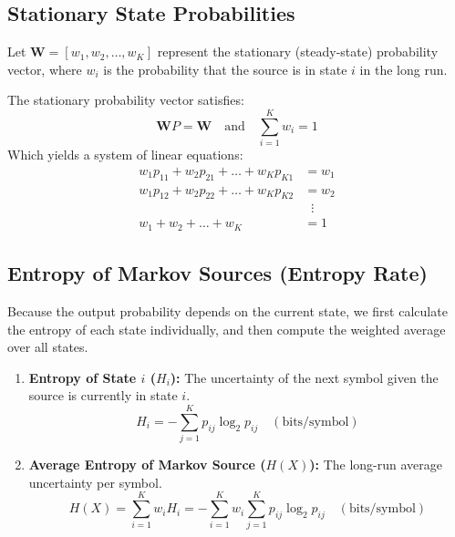 \documentclass[12pt,a4paper]{article}
\begin{document}
\subsection{Stationary State Probabilities}
Let $\mathbf{W} = [w_1, w_2, \dots, w_K]$ represent the stationary (steady-state) probability vector, where $w_i$ is the probability that the source is in state $i$ in the long run.
\begin{tcolorbox}[formulabox, title={\textbf{Stationary State Probability Equations}}]
The stationary probability vector satisfies:
\begin{equation}
  \mathbf{W} P = \mathbf{W} \quad \text{and} \quad \sum_{i=1}^K w_i = 1
\end{equation}
Which yields a system of linear equations:
\begin{align}
  w_1 p_{11} + w_2 p_{21} + \dots + w_K p_{K1} &= w_1 \\
  w_1 p_{12} + w_2 p_{22} + \dots + w_K p_{K2} &= w_2 \\
  &\;\; \vdots \\
  w_1 + w_2 + \dots + w_K &= 1
\end{align}
\end{tcolorbox}

\subsection{Entropy of Markov Sources (Entropy Rate)}
Because the output probability depends on the current state, we first calculate the entropy of each state individually, and then compute the weighted average over all states.
\begin{tcolorbox}[formulabox, title={\textbf{Markov Source Entropy Rate Formulas}}]
\begin{enumerate}[label=\textbf{\arabic*.}, leftmargin=1.5em, itemsep=4pt, topsep=2pt]
  \item \textbf{Entropy of State $i$ ($H_i$):} The uncertainty of the next symbol given the source is currently in state $i$.
    \begin{equation}
      H_i = -\sum_{j=1}^K p_{ij} \log_2 p_{ij} \quad (\text{bits/symbol})
    \end{equation}
  \item \textbf{Average Entropy of Markov Source ($H(X)$):} The long-run average uncertainty per symbol.
    \begin{equation}
      H(X) = \sum_{i=1}^K w_i H_i = -\sum_{i=1}^K w_i \sum_{j=1}^K p_{ij} \log_2 p_{ij} \quad (\text{bits/symbol})
    \end{equation}
\end{enumerate}
\end{tcolorbox}
\end{document}
